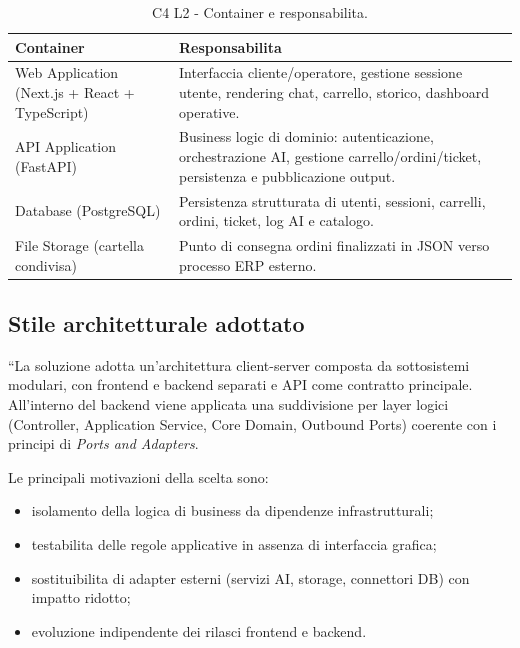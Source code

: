\documentclass[a4paper, 11pt, oneside]{scrartcl}
\begin{document}
\begin{table}[H]
    \centering
    \renewcommand{\arraystretch}{1.2}
    \begin{tabularx}{\textwidth}{@{}lL@{}}
        \toprule
        \textbf{Container} & \textbf{Responsabilita} \\
        \midrule
        Web Application (Next.js + React + TypeScript) & Interfaccia cliente/operatore, gestione sessione utente, rendering chat, carrello, storico, dashboard operative. \\
        API Application (FastAPI) & Business logic di dominio: autenticazione, orchestrazione AI, gestione carrello/ordini/ticket, persistenza e pubblicazione output. \\
        Database (PostgreSQL) & Persistenza strutturata di utenti, sessioni, carrelli, ordini, ticket, log AI e catalogo. \\
        File Storage (cartella condivisa) & Punto di consegna ordini finalizzati in JSON verso processo ERP esterno. \\
        \bottomrule
    \end{tabularx}
    \caption{C4 L2 - Container e responsabilita.}
\end{table}

\subsection{Stile architetturale adottato}
“La soluzione adotta un'architettura client-server composta da sottosistemi modulari, con frontend e backend separati e API come contratto principale.
All'interno del backend viene applicata una suddivisione per layer logici (Controller, Application Service, Core Domain, Outbound Ports) coerente con i principi di \textit{Ports and Adapters}.

Le principali motivazioni della scelta sono:
\begin{itemize}
    \item isolamento della logica di business da dipendenze infrastrutturali;
    \item testabilita delle regole applicative in assenza di interfaccia grafica;
    \item sostituibilita di adapter esterni (servizi AI, storage, connettori DB) con impatto ridotto;
    \item evoluzione indipendente dei rilasci frontend e backend.
\end{itemize}

\newpage
\end{document}
